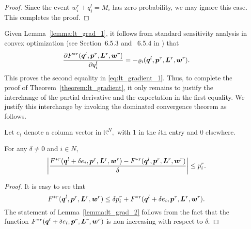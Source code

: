 \begin{proof}
Since the event $w^r_i + q^l_i = M_i$ 
has zero probability, we may
ignore this case. This completes the proof.
%
%
\end{proof}

Given Lemma~\ref{lemma:lt_grad_1}, it follows from standard
sensitivity analysis in convex optimization (see Section~6.5.3 and
~6.5.4 in \cite{Bertsekas03}) that 
\begin{equation}
  \label{eq:grad_lt}
  \frac{\partial
    F^{*r}(\boldsymbol{q}^l,\boldsymbol{p}^r,\boldsymbol{L}^r,\boldsymbol{w}^r)}
  {\partial q^l_i} =-
  \varrho_i(\boldsymbol{q}^l,\boldsymbol{p}^r,\boldsymbol{L}^r,\boldsymbol{w}^r).  
\end{equation}
This proves the second equality in \eqref{eq:lt_gradient_1}. Thus, to
complete the proof of Theorem~\ref{theorem:lt_gradient}, it only
remains to justify the interchange of the partial derivative and the
expectation in the first equality. We justify this interchange by
invoking the dominated convergence theorem as follows.

Let $e_i$ denote a column vector in $\mathbb{R}^N,$ with 1 in the
$i$th entry and 0 elsewhere.
\begin{lemma}
  \label{lemma:lt_grad_2}
  For any $\delta \neq 0$ and $i \in N,$
  \begin{equation*}
    \left|\frac{F^{*r}(\boldsymbol{q}^l + \delta e_i,\boldsymbol{p}^r,\boldsymbol{L}^r,\boldsymbol{w}^r) - 
        F^{*r}(\boldsymbol{q}^l,\boldsymbol{p}^r,\boldsymbol{L}^r,\boldsymbol{w}^r)}{\delta}\right| \leq p^r_i.
  \end{equation*}  
\end{lemma}
\begin{proof}
  It is easy to see
  that $$F^{*r}(\boldsymbol{q}^l,\boldsymbol{p}^r,\boldsymbol{L}^r,\boldsymbol{w}^r)
  \leq \delta p^r_i + F^{*r}(\boldsymbol{q}^l + \delta
  e_i,\boldsymbol{p}^r,\boldsymbol{L}^r,\boldsymbol{w}^r).$$ The statement of
  Lemma~\ref{lemma:lt_grad_2} follows from the fact that
  the function $F^{*r}(\boldsymbol{q}^l + \delta
  e_i,\boldsymbol{p}^r,\boldsymbol{L}^r,\boldsymbol{w}^r)$ is non-increasing with
  respect to $\delta.$
\end{proof}

